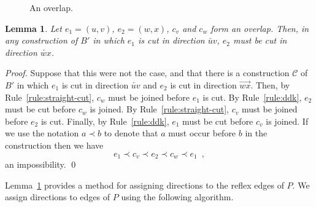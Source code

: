 \documentclass{elsart}
\newtheorem{lemma}{Lemma}
\newenvironment{proof}{\emph{Proof.}}{\qed}
\begin{document}
\begin{figure}
  \begin{center}
  \end{center}
  \caption{An overlap.}
\label{fig:overlap}
\end{figure}

\begin{lemma}\label{lem:direction}
  Let $e_1=(u,v)$, $e_2=(w,x)$, $c_v$ and $c_w$ form an overlap.
  Then, in any construction of $B'$ in which $e_1$ is cut in direction
  $\overleftarrow{uv}$, $e_2$ must be cut in direction
  $\overleftarrow{wx}$.
\end{lemma}

\begin{proof}
  Suppose that this were not the case, and that there is a construction
  $\mathcal{C}$ of $B'$ in which $e_1$ is cut in direction $\overleftarrow{uv}$
  and $e_2$ is cut in direction $\overrightarrow{wx}$.  Then, by
  Rule~\ref{rule:straight-cut}, $c_w$ must be joined before $e_1$ is cut. By
  Rule~\ref{rule:ddk}, $e_2$ must be cut before $c_w$ is joined. By
  Rule~\ref{rule:straight-cut}, $c_v$ must be joined before $e_2$ is
  cut. Finally, by Rule~\ref{rule:ddk}, $e_1$ must be cut before $c_v$ is
  joined.  If we use the notation $a\prec b$ to denote that $a$ must occur
before $b$ in the construction then we have
\[ e_1 \prec c_v \prec e_2 \prec c_w \prec e_1 \enspace ,\] 
an impossibility.
\end{proof}

Lemma~\ref{lem:direction} provides a method for assigning directions
to the reflex edges of $P$. We assign directions to edges of $P$ using
the following algorithm.
\end{document}
